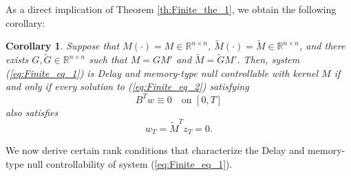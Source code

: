\documentclass[12pt]{article}
\theoremstyle{plain}
\newtheorem{corollary}[theorem]{Corollary}
\theoremstyle{definition}
\begin{document}
As a direct implication of Theorem \ref{th:Finite_the_1}, we obtain the following corollary:
\begin{corollary}
    \textit{
Suppose that \( M(\cdot) = M \in \mathbb{R}^{n \times n} \), \( \widetilde{M}(\cdot) = \widetilde{M} \in \mathbb{R}^{n \times n} \), and there exists \( G, \widetilde{G} \in \mathbb{R}^{n \times n} \) such that \( M = G M' \) and \( \widetilde{M} = \widetilde{G} M' \). Then, system (\ref{eq:Finite_eq_1}) is Delay and memory-type null controllable with kernel \( M \) if and only if every solution to (\ref{eq:Finite_eq_2}) satisfying
\[
B^T w \equiv 0 \quad \text{on } [0,T]
\]
also satisfies
\[
w_T = \widetilde{M}^T z_T = 0.
\]
}
\end{corollary}

We now derive certain rank conditions that characterize the Delay and memory-type null controllability of system (\ref{eq:Finite_eq_1}).
\end{document}
